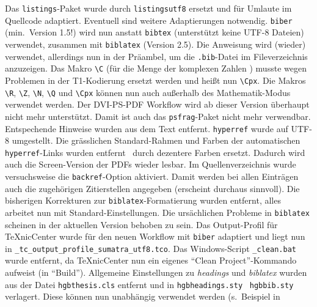 \begin{sloppypar}
\begin{description}
\newline
Das \texttt{listings}-Paket wurde durch \texttt{listingsutf8} ersetzt und für Umlaute im Quellcode adaptiert.
Eventuell sind weitere Adaptierungen notwendig.
\newline
\texttt{biber} (min.\ Version 1.5!) wird nun anstatt \texttt{bibtex} (unterstützt keine UTF-8 Dateien) verwendet,
zusammen mit \texttt{biblatex} (Version 2.5).
Die Anweisung \verb!! wird (wieder) verwendet, allerdings nun in der Präambel,
um die \texttt{.bib}-Datei im Fileverzeichnis anzuzeigen.
\newline
Das Makro \verb!\C! (für die Menge der komplexen Zahlen \Cpx) musste wegen Problemen in der T1-Kodierung
ersetzt werden und heißt nun \verb!\Cpx!. Die Makros 
\verb!\R!, \verb!\Z!, \verb!\N!, \verb!\Q! und \verb!\Cpx! können nun auch außerhalb des Mathematik-Modus verwendet werden.
\newline
Der DVI-PS-PDF Workflow wird ab dieser Version überhaupt nicht mehr unterstützt. 
Damit ist auch das \texttt{psfrag}-Paket nicht mehr verwendbar. Entspechende Hinweise 
wurden aus dem Text entfernt.
\newline
\texttt{hyperref} wurde auf UTF-8 umgestellt.
Die grässlichen Standard-Rahmen und Farben der automatischen \texttt{hyperref}-Links wurden entfernt \bzw\ durch 
dezentere Farben ersetzt. Dadurch wird auch die Screen-Version der PDFs wieder lesbar.
\newline
Im Quellenverzeichnis wurde versuchsweise die \texttt{backref}-Option aktiviert. 
Damit werden bei allen Einträgen auch die zugehörigen Zitierstellen angegeben
(erscheint durchaus sinnvoll).
\newline
Die bisherigen Korrekturen zur \texttt{biblatex}-Formatierung wurden entfernt, 
alles arbeitet nun mit Standard-Einstellungen. Die ursächlichen Probleme in \texttt{biblatex}
scheinen in der aktuellen Version behoben zu sein.
\newline
Das Output-Profil für TeXnicCenter wurde für den neuen Workflow mit \texttt{biber} adaptiert und liegt nun in
\nolinkurl{_tc_output_profile_sumatra_utf8.tco}.
\newline
Das Windows-Script \verb!_clean.bat! wurde entfernt, da TeXnicCenter nun ein eigenes "`Clean Project"'-Kommando aufweist (in "`Build"').
\newline
Allgemeine Einstellungen zu \emph{headings} und \emph{biblatex} wurden aus der Datei \texttt{hgbthesis.cls} entfernt und in 
\texttt{hgbheadings.sty} \bzw\ \texttt{hgbbib.sty} verlagert. Diese können nun unabhängig verwendet werden (s.\ Beispiel in 

\end{description}
\end{sloppypar}
